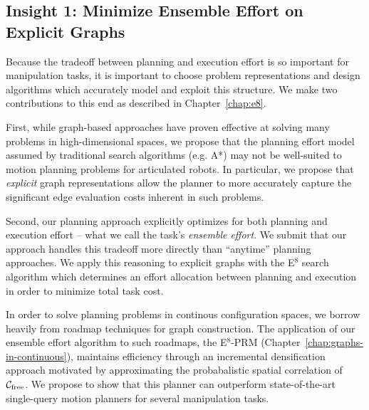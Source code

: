 \subsection*{Insight 1: Minimize Ensemble Effort on Explicit Graphs}

Because the tradeoff between planning and execution effort
is so important for manipulation tasks,
it is important to choose problem representations and design algorithms
which accurately model and exploit this structure.
We make two contributions to this end
as described in Chapter~\ref{chap:e8}.

First,
while graph-based approaches have proven effective at solving
many problems in high-dimensional spaces,
we propose that the planning effort model assumed by
traditional search algorithms (e.g. A*)
may not be well-suited to motion planning problems for articulated
robots.
In particular,
we propose that \emph{explicit} graph representations
allow the planner to more accurately capture the significant
edge evaluation costs inherent in such problems.

Second,
our planning approach explicitly optimizes for both planning
and execution effort
-- what we call the task's \emph{ensemble effort}.
We submit that our approach handles this tradeoff more directly
than ``anytime'' planning approaches.
We apply this reasoning to explicit graphs
with the E$^8$ search algorithm
which determines an effort allocation between planning and execution
in order to minimize total task cost.

In order to solve planning problems in continous configuration spaces,
we borrow heavily from roadmap techniques for graph construction.
The application of our ensemble effort algorithm to such roadmaps,
the E$^8$-PRM (Chapter~\ref{chap:graphs-in-continuous}),
maintains efficiency through an
incremental densification approach
motivated by approximating the probabalistic spatial correlation of
$\mathcal{C}_{\mbox{\scriptsize free}}$.
We propose to show that this planner can outperform state-of-the-art
single-query motion planners for several manipulation tasks.

